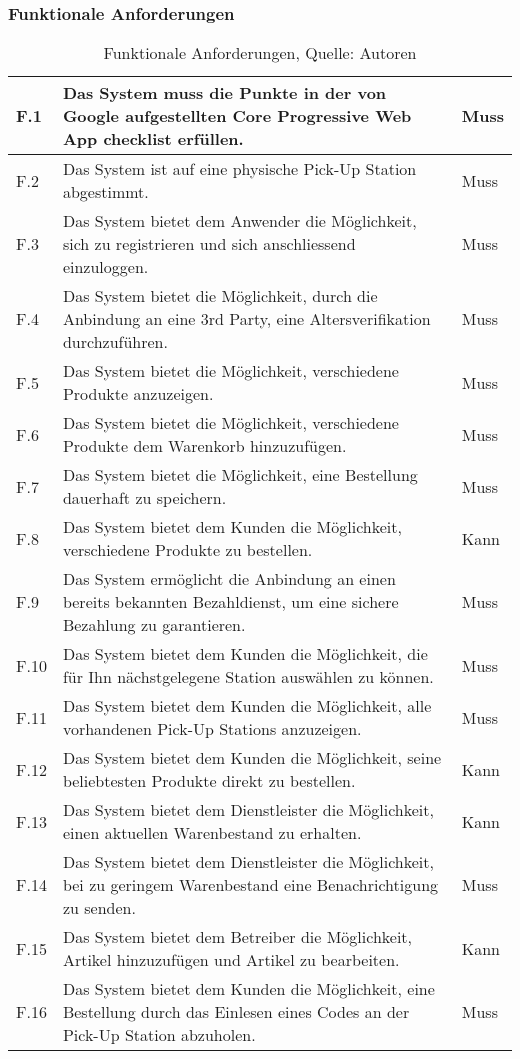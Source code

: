 \subsubsection{Funktionale Anforderungen}\label{funktionaleAnforderungen}
\begin{table}[H]
	\setlength\extrarowheight{2pt} %
	\begin{tabularx}{\textwidth}{|l|X|l|}
		\hline
		F.1 & Das System muss die Punkte in der von Google aufgestellten Core Progressive Web App checklist erfüllen. \cite{pwaChecklist} & Muss \\
		\hline
		F.2 & Das System ist auf eine physische Pick-Up Station abgestimmt. & Muss \\
		\hline
		F.3 & Das System bietet dem Anwender die Möglichkeit, sich zu registrieren und sich anschliessend einzuloggen. & Muss \\
		\hline
		F.4 & Das System bietet die Möglichkeit, durch die Anbindung an eine 3rd Party, eine Altersverifikation durchzuführen.  & Muss \\
		\hline
		F.5 & Das System bietet die Möglichkeit, verschiedene Produkte anzuzeigen. & Muss \\
		\hline
		F.6 & Das System bietet die Möglichkeit, verschiedene Produkte dem Warenkorb hinzuzufügen. & Muss \\
		\hline
		F.7& Das System bietet die Möglichkeit, eine Bestellung dauerhaft zu speichern. & Muss \\
		\hline
		F.8 & Das System bietet dem Kunden die Möglichkeit, verschiedene Produkte zu bestellen. & Kann \\
		\hline
		F.9 & Das System ermöglicht die Anbindung an einen bereits bekannten Bezahldienst, um eine sichere Bezahlung zu garantieren. & Muss \\
		\hline
		F.10 & Das System bietet dem Kunden die Möglichkeit, die für Ihn nächstgelegene Station auswählen zu können.  & Muss \\
		\hline
		F.11 & Das System bietet dem Kunden die Möglichkeit, alle vorhandenen Pick-Up Stations anzuzeigen.  & Muss \\
		\hline
		F.12 & Das System bietet dem Kunden die Möglichkeit, seine beliebtesten Produkte direkt zu bestellen. & Kann \\
		\hline
		F.13 & Das System bietet dem Dienstleister die Möglichkeit, einen aktuellen Warenbestand zu erhalten. & Kann \\
		\hline
		F.14 & Das System bietet dem Dienstleister die Möglichkeit, bei zu geringem Warenbestand eine Benachrichtigung zu senden. & Muss \\
		\hline
		F.15 & Das System bietet dem Betreiber die Möglichkeit, Artikel hinzuzufügen und Artikel zu bearbeiten. & Kann \\
		\hline
		F.16 & Das System bietet dem Kunden die Möglichkeit, eine Bestellung durch das Einlesen eines Codes an der Pick-Up Station abzuholen. & Muss \\
		\hline
		
		
	\end{tabularx}
	\caption{ \label{tbl: FunktionaleAnforderungent}Funktionale Anforderungen, Quelle: Autoren}
\end{table}
